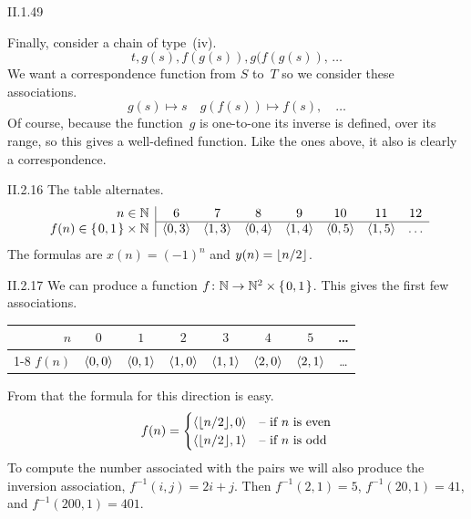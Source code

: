 \begin{ans}{II.1.49}
\begin{exparts}
Finally, consider a chain of type~(iv).
\begin{equation*}
  t,g(s),f(g(s)),g(f(g(s)),\, \ldots{}
\end{equation*}
We want a correspondence function from $S$ to~$T$
so we consider these associations.
\begin{equation*}
  g(s)\mapsto s\quad
  g(f(s))\mapsto f(s),\quad\ldots
\end{equation*}
Of course, because the function~$g$ is one-to-one its inverse is defined,
over its range, so this gives a well-defined function.
Like the ones above, it also is clearly a correspondence.
\end{exparts}
\end{ans}
%
\begin{ans}{II.2.16}
The table alternates.
\begin{equation*}
  \begin{array}{r|ccccccc}
    n\in\N
      &6 &7 &8 &9 &10 &11 &12 \\ \cline{2-8}
    f(n)\in\set{0,1}\times \N
      &\sequence{0,3} \rule{0em}{2ex} %
      &\sequence{1,3}
      &\sequence{0,4}
      &\sequence{1,4}
      &\sequence{0,5}
      &\sequence{1,5}
      &\ldots
  \end{array}
\end{equation*}
The formulas are $x(n)=(-1)^n$
and $y(n)=\lfloor n/2\rfloor$.
\end{ans}
%
\begin{ans}{II.2.17}
We can produce a function $\map{f}{\N}{\N^2\times\set{0,1}}$.
This gives the first few associations.
\begin{display}
\begin{tabular}{r|ccccccc}
  $n$    &$0$ &$1$ &$2$ &$3$ &$4$ &$5$ &\ldots \\ \cline{1-8}
  $f(n)$ &$\langle0,0\rangle$ &$\langle0,1\rangle$ &$\langle1,0\rangle$
         &$\langle1,1\rangle$ &$\langle2,0\rangle$ &$\langle2,1\rangle$ &\ldots
\end{tabular}
\end{display}
From that the formula for this direction is easy.
\begin{equation*}
  f(n)=
  \begin{cases}
    \langle\lfloor n/2\rfloor,0\rangle  &\text{-- if $n$ is even}  \\
    \langle\lfloor n/2\rfloor,1\rangle  &\text{-- if $n$ is odd}  \\
  \end{cases}
\end{equation*}
To compute the number associated with the pairs we will also produce
the inversion association, $f^{-1}(i,j)=2i+j$.
Then $f^{-1}(2,1)=5$,
$f^{-1}(20,1)=41$,
and $f^{-1}(200,1)=401$.
\end{ans}
